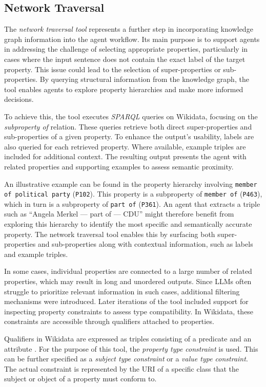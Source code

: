 \documentclass[a4paper,oneside,bibliography=totoc]{scrbook}
\begin{document}
\subsection{Network Traversal}
\label{subsec:network_traversal}

The \textit{network traversal tool} represents a further step in incorporating knowledge graph information into the agent workflow. Its main purpose is to support agents in addressing the challenge of selecting appropriate properties, particularly in cases where the input sentence does not contain the exact label of the target property. This issue could lead to the selection of super-properties or sub-properties. By querying structural information from the knowledge graph, the tool enables agents to explore property hierarchies and make more informed decisions.

To achieve this, the tool executes \textit{SPARQL} queries on Wikidata, focusing on the \textit{subproperty of} relation. These queries retrieve both direct super-properties and sub-properties of a given property. To enhance the output's usability, labels are also queried for each retrieved property. Where available, example triples are included for additional context. The resulting output presents the agent with related properties and supporting examples to assess semantic proximity.

An illustrative example can be found in the property hierarchy involving \texttt{member of political party} (\texttt{P102}). This property is a subproperty of \texttt{member of} (\texttt{P463}), which in turn is a subproperty of \texttt{part of} (\texttt{P361}). An agent that extracts a triple such as “Angela Merkel — part of — CDU” might therefore benefit from exploring this hierarchy to identify the most specific and semantically accurate property. The network traversal tool enables this by surfacing both super-properties and sub-properties along with contextual information, such as labels and example triples.

In some cases, individual properties are connected to a large number of related properties, which may result in long and unordered outputs. Since \acp{LLM} often struggle to prioritize relevant information in such cases, additional filtering mechanisms were introduced. Later iterations of the tool included support for inspecting property constraints to assess type compatibility. In Wikidata, these constraints are accessible through qualifiers attached to properties.

Qualifiers in Wikidata are expressed as triples consisting of a predicate and an attribute \cite{Wikidata2025}. For the purpose of this tool, the \textit{property type constraint} is used. This can be further specified as a \textit{subject type constraint} or a \textit{value type constraint}. The actual constraint is represented by the URI of a specific class that the subject or object of a property must conform to.
\end{document}
